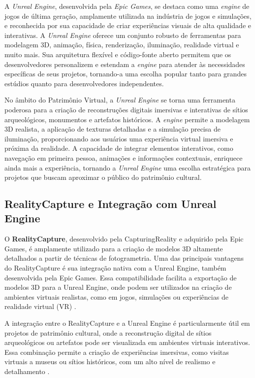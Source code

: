 A \textit{Unreal Engine}, desenvolvida pela\textit{ Epic Games}, se destaca como uma \textit{engine} de jogos de última geração, amplamente utilizada na indústria de jogos e simulações, e reconhecida por sua capacidade de criar experiências visuais de alta qualidade e interativas.  A \textit{Unreal Engine} oferece um conjunto robusto de ferramentas para modelagem 3D, animação, física, renderização, iluminação, realidade virtual e muito mais. Sua arquitetura flexível e código-fonte aberto permitem que os desenvolvedores personalizem e estendam a \textit{engine} para atender às necessidades específicas de seus projetos, tornando-a uma escolha popular tanto para grandes estúdios quanto para desenvolvedores independentes.

No âmbito do Patrimônio Virtual, a \textit{Unreal Engine} se torna uma ferramenta poderosa para a criação de reconstruções digitais imersivas e interativas de sítios arqueológicos, monumentos e artefatos históricos. A \textit{engine} permite a modelagem 3D realista, a aplicação de texturas detalhadas e a simulação precisa de iluminação, proporcionando aos usuários uma experiência virtual imersiva e próxima da realidade. A capacidade de integrar elementos interativos, como navegação em primeira pessoa, animações e informações contextuais, enriquece ainda mais a experiência, tornando a \textit{Unreal Engine} uma escolha estratégica para projetos que buscam aproximar o público do patrimônio cultural.

\subsection{RealityCapture e Integração com Unreal Engine}
O \textbf{RealityCapture}, desenvolvido pela CapturingReality e adquirido pela Epic Games, é amplamente utilizado para a criação de modelos 3D altamente detalhados a partir de técnicas de fotogrametria. Uma das principais vantagens do RealityCapture é sua integração nativa com a Unreal Engine, também desenvolvida pela Epic Games. Essa compatibilidade facilita a exportação de modelos 3D para a Unreal Engine, onde podem ser utilizados na criação de ambientes virtuais realistas, como em jogos, simulações ou experiências de realidade virtual (VR) \citep{EpicGamesDocs}.

A integração entre o RealityCapture e a Unreal Engine é particularmente útil em projetos de patrimônio cultural, onde a reconstrução digital de sítios arqueológicos ou artefatos pode ser visualizada em ambientes virtuais interativos. Essa combinação permite a criação de experiências imersivas, como visitas virtuais a museus ou sítios históricos, com um alto nível de realismo e detalhamento \citep{ExemploArtigo}.
